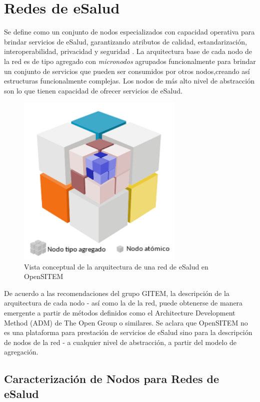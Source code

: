 \section{Redes de eSalud}

Se define como un conjunto de nodos especializados con capacidad operativa para brindar servicios de eSalud, garantizando atributos de calidad, estandarización, interoperabilidad, privacidad y seguridad \cite{wilson2017}. La arquitectura base de cada nodo de la red es de tipo agregado con \textit{micronodos} agrupados funcionalmente para brindar un conjunto de servicios que pueden ser consumidos por otros nodos,creando así estructuras funcionalmente complejas. Los nodos de más alto nivel de abstracción son lo que tienen capacidad de ofrecer servicios de eSalud.

\begin{figure}
 \centering
 \includegraphics[width=80mm, height=83mm]{concepto_red_esalud.png}
 \caption{Vista conceptual de la arquitectura de una red de eSalud en OpenSITEM}
 \label{elementosred}
\end{figure}

De acuerdo a las recomendaciones del grupo GITEM, la descripción de la arquitectura de cada nodo - así como la de la red, puede obtenerse de manera emergente a partir de métodos definidos como el Architecture Development Method (ADM) de The Open Group o similares. Se aclara que OpenSITEM no es una plataforma para prestación de servicios de eSalud sino para la descripción de nodos de la red - a cualquier nivel de abstracción, a partir del modelo de agregación. 

\subsection{Caracterización de Nodos para Redes de eSalud}

